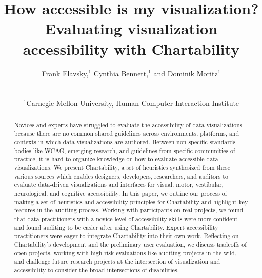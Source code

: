 \documentclass{egpubl}
\title[Chartability]%
      {How accessible is my visualization? Evaluating visualization accessibility with Chartability}
\author[F. Elavsky, C. Bennett, \& D. Moritz]
{\parbox{\textwidth}{\centering Frank Elavsky,$^{1}$\orcid{0000-0002-6849-5893}
        Cynthia Bennett,$^{1}$
        and Dominik Moritz$^{1}$\orcid{0000-0002-3110-1053}
        }
        \\
{\parbox{\textwidth}{\centering $^1$Carnegie Mellon University, Human-Computer Interaction Institute\\
       } 
}
}
\begin{document}
\def\arraystretch{0.8}


\maketitle
\begin{abstract}
Novices and experts have struggled to evaluate the accessibility of data visualizations because there are no common shared guidelines across environments, platforms, and contexts in which data visualizations are authored. Between non-specific standards bodies like WCAG, emerging research, and guidelines from specific communities of practice, it is hard to organize knowledge on how to evaluate accessible data visualizations. We present Chartability, a set of heuristics synthesized from these various sources which enables designers, developers, researchers, and auditors to evaluate data-driven visualizations and interfaces for visual, motor, vestibular, neurological, and cognitive accessibility. In this paper, we outline our process of making a set of heuristics and accessibility principles for Chartability and highlight key features in the auditing process. Working with participants on real projects, we found that data practitioners with a novice level of accessibility skills were more confident and found auditing to be easier after using Chartability. Expert accessibility practitioners were eager to integrate Chartability into their own work. Reflecting on Chartability’s development and the preliminary user evaluation, we discuss tradeoffs of open projects, working with high-risk evaluations like auditing projects in the wild, and challenge future research projects at the intersection of visualization and accessibility to consider the broad intersections of disabilities.


\end{abstract}
\end{document}
